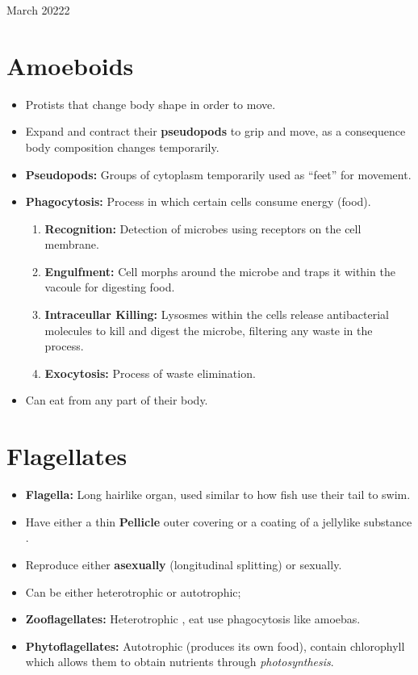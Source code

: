 \documentclass[12pt,oneside]{book} %
\begin{document}
\begin{lec}{March 20222}
  \section*{Amoeboids}
  \begin{itemize}
    \item Protists that change body shape in order to move.
    \item Expand and contract their \textbf{pseudopods} to grip and move, as a consequence body composition changes
       temporarily. 
    \item \textbf{Pseudopods:} Groups of cytoplasm temporarily used as ``feet'' for movement.
    \item \textbf{Phagocytosis:} Process in which certain cells consume energy (food).
       \begin{enumerate}
         \item \textbf{Recognition:} Detection of microbes using receptors on the cell membrane.
         \item \textbf{Engulfment:} Cell morphs around the microbe and traps it within the vacoule for digesting food.
         \item \textbf{Intraceullar Killing:} Lysosmes within the cells release antibacterial molecules to kill and digest
            the microbe, filtering any waste in the process.
         \item \textbf{Exocytosis:} Process of waste elimination.
       \end{enumerate}
    \item Can eat from any part of their body.
  \end{itemize}

  \section*{Flagellates}

  \begin{itemize}
    \item \textbf{Flagella:} Long hairlike organ, used similar to how fish use their tail to swim.
    \item Have either a thin \textbf{Pellicle} outer covering or a coating of a jellylike substance . 
    \item Reproduce either \textbf{asexually} (longitudinal splitting) or sexually.
    \item Can be either heterotrophic or autotrophic;
    \item \textbf{Zooflagellates:} Heterotrophic , eat use phagocytosis like amoebas.
    \item \textbf{Phytoflagellates:} Autotrophic (produces its own food), contain chlorophyll which allows them to obtain
       nutrients through \textit{photosynthesis}.
  \end{itemize}


\end{lec}
\end{document}
